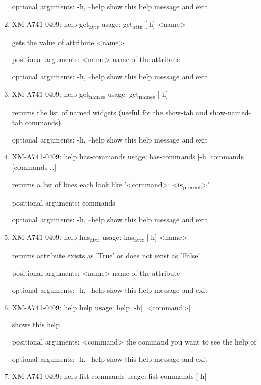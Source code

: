 \documentclass[11pt]{article}
\begin{document}
\begin{enumerate}
optional arguments:
  -h, --help  show this help message and exit

\item XM-A741-0409: help get\textsubscript{attr}
\label{sec:org0eff765}
usage: get\textsubscript{attr} [-h] <name>

gets the value of attribute <name>

positional arguments:
  <name>      name of the attribute

optional arguments:
  -h, --help  show this help message and exit

\item XM-A741-0409: help get\textsubscript{names}
\label{sec:orgbcdddb4}
usage: get\textsubscript{names} [-h]

returns the list of named widgets (useful for the show-tab and show-named-tab
commands)

optional arguments:
  -h, --help  show this help message and exit

\item XM-A741-0409: help has-commands
\label{sec:org034f9c1}
usage: has-commands [-h] commands [commands \ldots{}]

returns a list of lines each look like '<command>: <is\textsubscript{present}>'

positional arguments:
  commands

optional arguments:
  -h, --help  show this help message and exit

\item XM-A741-0409: help has\textsubscript{attr}
\label{sec:orgefd9d62}
usage: has\textsubscript{attr} [-h] <name>

returns attribute exists as 'True' or does not exist as 'False'

positional arguments:
  <name>      name of the attribute

optional arguments:
  -h, --help  show this help message and exit

\item XM-A741-0409: help help
\label{sec:orgb2b9434}
usage: help [-h] [<command>]

shows this help

positional arguments:
  <command>   the command you want to see the help of

optional arguments:
  -h, --help  show this help message and exit

\item XM-A741-0409: help list-commands
\label{sec:org0b1648a}
usage: list-commands [-h]


\end{enumerate}
\end{document}
